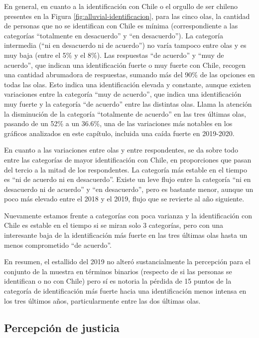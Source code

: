 \documentclass[
  12pt,
]{book}
\begin{document}
En general, en cuanto a la identificación con Chile o el orgullo de ser chileno presentes en la Figura \ref{fig:alluvial-identificacion}, para las cinco olas, la cantidad de personas que no se identifican con Chile es mínima (correspondiente a las categorías ``totalmente en desacuerdo'' y ``en desacuerdo''). La categoría intermedia (``ni en desacuerdo ni de acuerdo'') no varía tampoco entre olas y es muy baja (entre el 5\% y el 8\%). Las respuestas ``de acuerdo'' y ``muy de acuerdo'', que indican una identificación fuerte o muy fuerte con Chile, recogen una cantidad abrumadora de respuestas, sumando más del 90\% de las opciones en todas las olas. Esto indica una identificación elevada y constante, aunque existen variaciones entre la categoría ``muy de acuerdo'', que indica una identificación muy fuerte y la categoría ``de acuerdo'' entre las distintas olas. Llama la atención la disminución de la categoría ``totalmente de acuerdo'' en las tres últimas olas, pasando de un 52\% a un 36.6\%, una de las variaciones más notables en los gráficos analizados en este capítulo, incluida una caída fuerte en 2019-2020.

En cuanto a las variaciones entre olas y entre respondentes, se da sobre todo entre las categorías de mayor identificación con Chile, en proporciones que pasan del tercio a la mitad de los respondentes. La categoría más estable en el tiempo es ``ni de acuerdo ni en desacuerdo''. Existe un leve flujo entre la categoría ``ni en desacuerdo ni de acuerdo'' y ``en desacuerdo'', pero es bastante menor, aunque un poco más elevado entre el 2018 y el 2019, flujo que se revierte al año siguiente.

Nuevamente estamos frente a categorías con poca varianza y la identificación con Chile es estable en el tiempo si se miran solo 3 categorías, pero con una interesante baja de la identificación más fuerte en las tres últimas olas hasta un menos comprometido ``de acuerdo''.

En resumen, el estallido del 2019 no alteró sustancialmente la percepción para el conjunto de la muestra en términos binarios (respecto de si las personas se identifican o no con Chile) pero sí es notoria la pérdida de 15 puntos de la categoría de identificación más fuerte hacia una identificación menos intensa en los tres últimos años, particularmente entre las dos últimas olas.

\hypertarget{percepciuxf3n-de-justicia}{%
\subsection{Percepción de justicia}\label{percepciuxf3n-de-justicia}}
\end{document}
